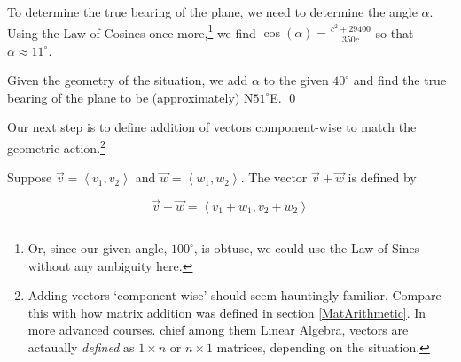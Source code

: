 \documentclass{ximera}
\begin{document}
\begin{example}
 

 To determine the true bearing of the plane, we need to determine the angle $\alpha$.  Using the Law of Cosines once more,\footnote{Or, since our given angle, $100^{\circ}$, is obtuse, we could use the Law of Sines without any ambiguity here.} we find $\cos(\alpha) = \frac{c^2+29400}{350c}$ so that $\alpha \approx 11^{\circ}$.  
 
  
 
 Given the geometry of the situation, we add $\alpha$ to the given $40^{\circ}$ and find the true bearing of the plane to be (approximately) N$51^{\circ}$E. \qed

\end{example}

Our next step is to define addition of vectors component-wise to match the geometric action.\footnote{Adding vectors `component-wise' should seem hauntingly familiar.  Compare this with how matrix addition was defined in section \ref{MatArithmetic}. In more advanced courses. chief among them Linear Algebra, vectors are actaually \textit{defined} as $1\times n$ or $n \times 1$ matrices, depending on the situation.}

 

\begin{definition} \label{vectoradd}  Suppose $\overrightarrow{v} = \left<v_1,v_2\right>$ and $\overrightarrow{w} = \left<w_1,w_2\right>$.  The vector $\overrightarrow{v} + \overrightarrow{w}$ is defined by 

\[ \overrightarrow{v} + \overrightarrow{w}  = \left< v_1 + w_1, v_2 + w_2 \right> \]


\end{definition}
\end{document}
